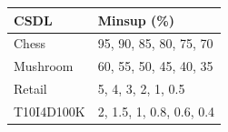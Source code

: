\begin{tabular}{ll}
\toprule
CSDL & Minsup (\%) \\
\midrule
Chess & 95, 90, 85, 80, 75, 70 \\
Mushroom & 60, 55, 50, 45, 40, 35 \\
Retail & 5, 4, 3, 2, 1, 0.5 \\
T10I4D100K & 2, 1.5, 1, 0.8, 0.6, 0.4 \\
\bottomrule
\end{tabular}

